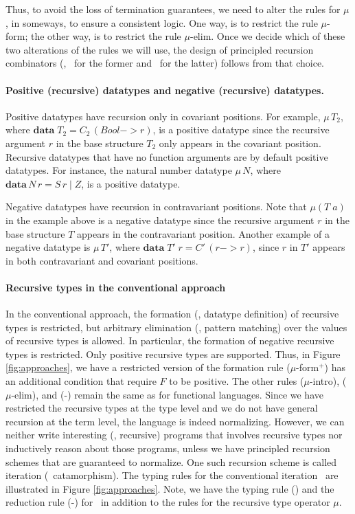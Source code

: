 Thus, to avoid the loss of termination guarantees, we need to alter the rules
for $\mu$, in someways, to ensure a consistent logic. One way, is to restrict
the rule {\small $\mu$-form}; the other way, is to restrict the rule
{\small $\mu$-elim}. Once we decide which of these two alterations of the
rules we will use, the design of principled recursion combinators (\eg, \It\
for the former and \MIt\ for the latter) follows from that choice.

\paragraph{Positive (recursive) datatypes and negative (recursive) datatypes.}
Positive datatypes have recursion only in covariant positions.
For example, $\mu\,T_2$, where $\textbf{data}\;T_2 = C_2\,(Bool -> r)$,
is a positive datatype since the recursive argument $r$ in
the base structure $T_2$ only appears in the covariant position.
Recursive datatypes that have no function arguments are by default
positive datatypes. For instance, the natural number datatype $\mu\,N$,
where $\textbf{data}\,N\,r=S\,r \mid Z$, is a positive datatype.


Negative datatypes have recursion in contravariant positions.
Note that $\mu(T\;a)$ in the example above is a negative datatype
since the recursive argument $r$ in the base structure $T$ appears
in the contravariant position. Another example of a negative datatype is
$\mu\,T'$, where $\textbf{data}\;T'\;r = C'\,(r -> r)$, since $r$ in $T'$
appears in both contravariant and covariant positions.

\paragraph{Recursive types in the conventional approach}
In the conventional approach, the formation (\ie, datatype definition) of
recursive types is restricted, but arbitrary elimination (\ie, pattern matching)
over the values of recursive types is allowed. In particular, the formation of
negative recursive types is restricted. Only positive recursive types are
supported. Thus, in Figure \ref{fig:approaches}, we have a restricted version of
the formation rule {\small($\mu$-form$^{+}$)} has an additional condition that
require $F$ to be positive. The other rules {\small($\mu$-intro)},
{\small($\mu$-elim)}, and {\small(\unIn-\In)} remain the same as for
functional languages. Since we have restricted the recursive types
at the type level and we do not have general recursion at the term level,
the language is indeed normalizing. However, we can neither write
interesting (\ie, recursive) programs that involves recursive types nor
inductively reason about those programs, unless we have principled recursion
schemes that are guaranteed to normalize. One such recursion scheme is called
iteration (\aka\ catamorphism). The typing rules for the conventional iteration
\It\ are illustrated in Figure \ref{fig:approaches}. Note, we have the typing
rule {\small(\It)} and the reduction rule {\small(\It-\In)} for \It\,
in addition to the rules for the recursive type operator $\mu$.

